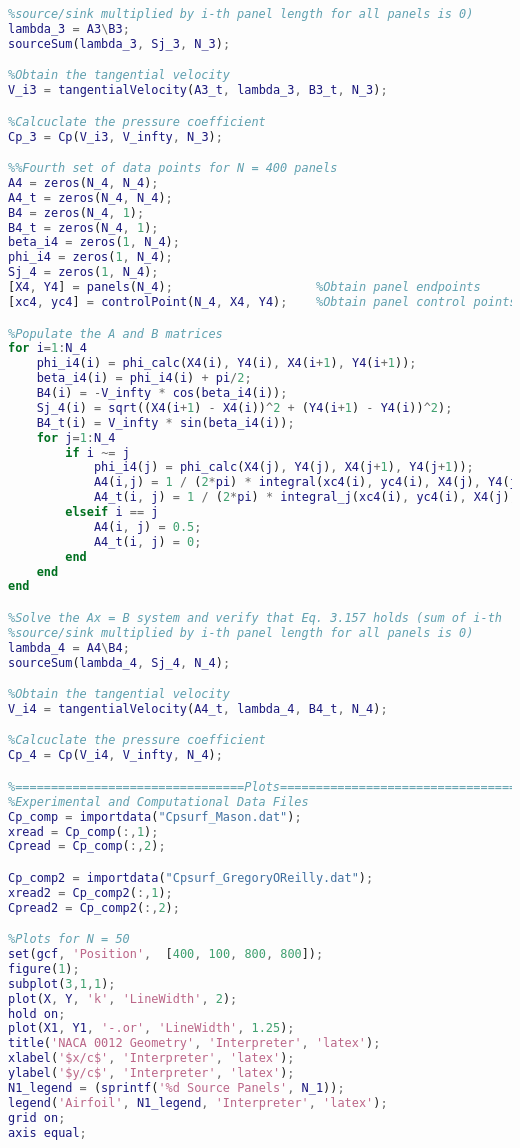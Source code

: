 \documentclass[12pt]{article}
\begin{document}
\begin{lstlisting}[language=Matlab]
%Solve the Ax = B system and verify that Eq. 3.157 holds (sum of i-th
%source/sink multiplied by i-th panel length for all panels is 0)
lambda_3 = A3\B3;
sourceSum(lambda_3, Sj_3, N_3);

%Obtain the tangential velocity
V_i3 = tangentialVelocity(A3_t, lambda_3, B3_t, N_3);

%Calcuclate the pressure coefficient
Cp_3 = Cp(V_i3, V_infty, N_3);

%%Fourth set of data points for N = 400 panels
A4 = zeros(N_4, N_4);
A4_t = zeros(N_4, N_4);
B4 = zeros(N_4, 1);
B4_t = zeros(N_4, 1);
beta_i4 = zeros(1, N_4);
phi_i4 = zeros(1, N_4);
Sj_4 = zeros(1, N_4);
[X4, Y4] = panels(N_4);                    %Obtain panel endpoints
[xc4, yc4] = controlPoint(N_4, X4, Y4);    %Obtain panel control points

%Populate the A and B matrices
for i=1:N_4
    phi_i4(i) = phi_calc(X4(i), Y4(i), X4(i+1), Y4(i+1));
    beta_i4(i) = phi_i4(i) + pi/2;
    B4(i) = -V_infty * cos(beta_i4(i)); 
    Sj_4(i) = sqrt((X4(i+1) - X4(i))^2 + (Y4(i+1) - Y4(i))^2);
    B4_t(i) = V_infty * sin(beta_i4(i));
    for j=1:N_4
        if i ~= j
            phi_i4(j) = phi_calc(X4(j), Y4(j), X4(j+1), Y4(j+1));
            A4(i,j) = 1 / (2*pi) * integral(xc4(i), yc4(i), X4(j), Y4(j), X4(j+1), Y4(j+1), phi_i4(i), phi_i4(j));
            A4_t(i, j) = 1 / (2*pi) * integral_j(xc4(i), yc4(i), X4(j), Y4(j), X4(j+1), Y4(j+1), phi_i4(i), phi_i4(j));
        elseif i == j
            A4(i, j) = 0.5;
            A4_t(i, j) = 0;
        end
    end
end

%Solve the Ax = B system and verify that Eq. 3.157 holds (sum of i-th
%source/sink multiplied by i-th panel length for all panels is 0)
lambda_4 = A4\B4;
sourceSum(lambda_4, Sj_4, N_4);

%Obtain the tangential velocity
V_i4 = tangentialVelocity(A4_t, lambda_4, B4_t, N_4);

%Calcuclate the pressure coefficient
Cp_4 = Cp(V_i4, V_infty, N_4);

%================================Plots=====================================
%Experimental and Computational Data Files
Cp_comp = importdata("Cpsurf_Mason.dat");
xread = Cp_comp(:,1);
Cpread = Cp_comp(:,2);

Cp_comp2 = importdata("Cpsurf_GregoryOReilly.dat");
xread2 = Cp_comp2(:,1);
Cpread2 = Cp_comp2(:,2);

%Plots for N = 50
set(gcf, 'Position',  [400, 100, 800, 800]);
figure(1);
subplot(3,1,1);
plot(X, Y, 'k', 'LineWidth', 2);
hold on;
plot(X1, Y1, '-.or', 'LineWidth', 1.25);
title('NACA 0012 Geometry', 'Interpreter', 'latex');
xlabel('$x/c$', 'Interpreter', 'latex');
ylabel('$y/c$', 'Interpreter', 'latex');
N1_legend = (sprintf('%d Source Panels', N_1));
legend('Airfoil', N1_legend, 'Interpreter', 'latex');
grid on;
axis equal;


\end{lstlisting}
\end{document}
